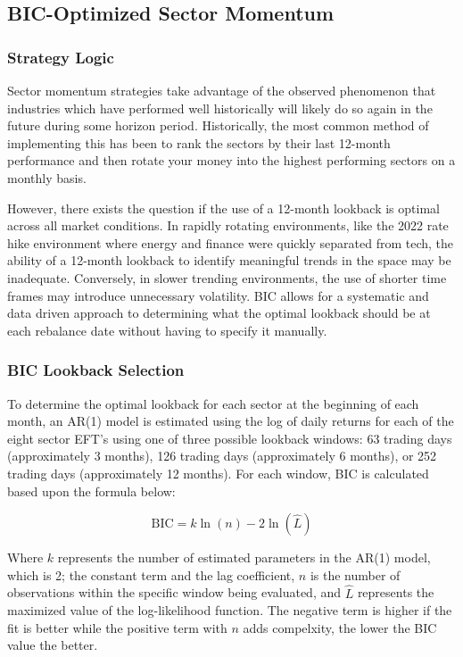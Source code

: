 \documentclass[12pt]{article}
\begin{document}
\subsection{BIC-Optimized Sector Momentum}

\subsubsection{Strategy Logic}

Sector momentum strategies take advantage of the observed phenomenon that industries which have performed well historically will likely do so again in the future during some horizon period. Historically, the most common method of implementing this has been to rank the sectors by their last 12-month performance and then rotate your money into the highest performing sectors on a monthly basis.

However, there exists the question if the use of a 12-month lookback is optimal across all market conditions. In rapidly rotating environments, like the 2022 rate hike environment where energy and finance were quickly separated from tech, the ability of a 12-month lookback to identify meaningful trends in the space may be inadequate. Conversely, in slower trending environments, the use of shorter time frames may introduce unnecessary volatility. BIC allows for a systematic and data driven approach to determining what the optimal lookback should be at each rebalance date without having to specify it manually.

\subsubsection{BIC Lookback Selection}

To determine the optimal lookback for each sector at the beginning of each month, an AR(1) model is estimated using the log of daily returns for each of the eight sector EFT's using one of three possible lookback windows: 63 trading days (approximately 3 months), 126 trading days (approximately 6 months), or 252 trading days (approximately 12 months). For each window, BIC is calculated based upon the formula below:

\begin{equation}
\text{BIC} = k \ln(n) - 2\ln(\hat{L})
\end{equation}

Where $k$ represents the number of estimated parameters in the AR(1) model, which is 2; the constant term and the lag coefficient, $n$ is the number of observations within the specific window being evaluated, and $\hat{L}$ represents the maximized value of the log-likelihood function. The negative term is higher if the fit is better while the positive term with $n$ adds compelxity, the lower the BIC value the better.
\end{document}
